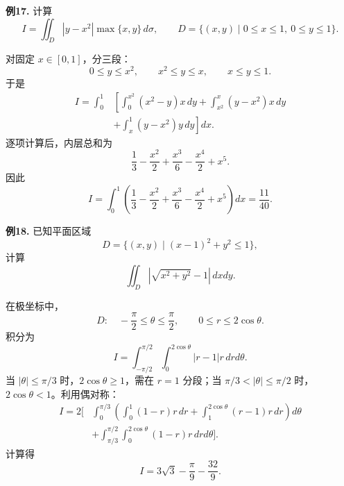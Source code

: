 \begin{problemblock}
\textbf{例17.} 计算
\[
I=\iint_D |y-x^2|\max\{x,y\}\,d\sigma,
\qquad
D=\{(x,y)\mid 0\le x\le1,\ 0\le y\le1\}.
\]
\end{problemblock}
\begin{solutionblock}
对固定 \(x\in[0,1]\)，分三段：
\[
0\le y\le x^2,\qquad x^2\le y\le x,\qquad x\le y\le1.
\]
于是
\[
\begin{aligned}
I=\int_0^1&\left[
\int_0^{x^2}(x^2-y)x\,dy
+\int_{x^2}^{x}(y-x^2)x\,dy\right.\\
&\left.+\int_x^1(y-x^2)y\,dy
\right]dx.
\end{aligned}
\]
逐项计算后，内层总和为
\[
\frac13-\frac{x^2}{2}+\frac{x^3}{6}-\frac{x^4}{2}+x^5.
\]
因此
\[
I=\int_0^1\left(
\frac13-\frac{x^2}{2}+\frac{x^3}{6}-\frac{x^4}{2}+x^5
\right)dx
=\frac{11}{40}.
\]
\end{solutionblock}

\begin{problemblock}
\textbf{例18.} 已知平面区域
\[
D=\{(x,y)\mid (x-1)^2+y^2\le1\},
\]
计算
\[
\iint_D\left|\sqrt{x^2+y^2}-1\right|\,dxdy.
\]
\end{problemblock}
\begin{solutionblock}
在极坐标中，
\[
D:\quad -\frac\pi2\le\theta\le\frac\pi2,\qquad 0\le r\le2\cos\theta.
\]
积分为
\[
I=\int_{-\pi/2}^{\pi/2}\int_0^{2\cos\theta}|r-1|r\,drd\theta.
\]
当 \(|\theta|\le\pi/3\) 时，\(2\cos\theta\ge1\)，需在 \(r=1\) 分段；当 \(\pi/3<|\theta|\le\pi/2\) 时，\(2\cos\theta<1\)。利用偶对称：
\[
\begin{aligned}
I=2\bigg[&
\int_0^{\pi/3}\left(\int_0^1(1-r)r\,dr+\int_1^{2\cos\theta}(r-1)r\,dr\right)d\theta\\
&+\int_{\pi/3}^{\pi/2}\int_0^{2\cos\theta}(1-r)r\,drd\theta
\bigg].
\end{aligned}
\]
计算得
\[
I=3\sqrt3-\frac{\pi}{9}-\frac{32}{9}.
\]
\end{solutionblock}

